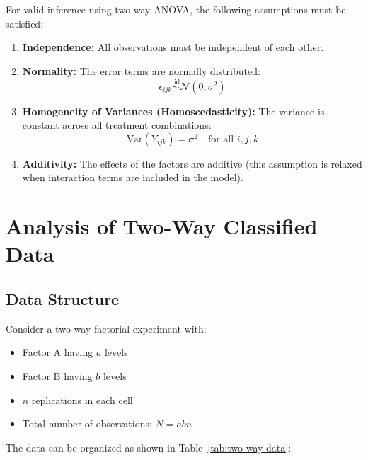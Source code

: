 \documentclass[twoside]{book}
\begin{document}
For valid inference using two-way ANOVA, the following assumptions must be satisfied:

\begin{enumerate}
\item \textbf{Independence:} All observations must be independent of each other.

\item \textbf{Normality:} The error terms are normally distributed:
\[
\epsilon_{ijk} \overset{\text{iid}}{\sim} \mathcal{N}(0, \sigma^2)
\]

\item \textbf{Homogeneity of Variances (Homoscedasticity):} The variance is constant across all treatment combinations:
\[
\text{Var}(Y_{ijk}) = \sigma^2 \quad \text{for all } i, j, k
\]

\item \textbf{Additivity:} The effects of the factors are additive (this assumption is relaxed when interaction terms are included in the model).
\end{enumerate}

\section{Analysis of Two-Way Classified Data}

\subsection{Data Structure}

Consider a two-way factorial experiment with:
\begin{itemize}
\item Factor A having $a$ levels
\item Factor B having $b$ levels
\item $n$ replications in each cell
\item Total number of observations: $N = abn$
\end{itemize}

The data can be organized as shown in Table~\ref{tab:two-way-data}:
\end{document}
